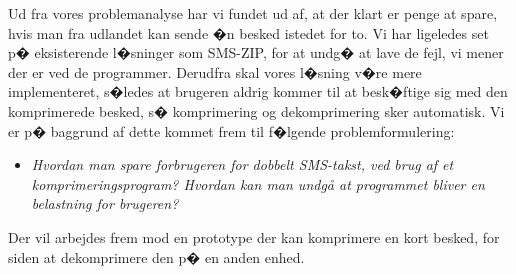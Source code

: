 Ud fra vores problemanalyse har vi fundet ud af, at der klart er penge at spare, hvis man fra udlandet kan sende �n besked istedet for to. Vi har ligeledes set p� eksisterende l�sninger som SMS-ZIP, for at undg� at lave de fejl, vi mener der er ved de programmer. Derudfra skal vores l�sning v�re mere implementeret, s�ledes at brugeren aldrig kommer til at besk�ftige sig med den komprimerede besked, s� komprimering og dekomprimering sker automatisk. Vi er p� baggrund af dette kommet frem til f�lgende problemformulering:

\begin{itemize}
\item[] \emph{Hvordan man spare forbrugeren for dobbelt SMS-takst, ved brug af et komprimeringsprogram? Hvordan kan man undgå at programmet bliver en belastning for brugeren?}
\end{itemize}

Der vil arbejdes frem mod en prototype der kan komprimere en kort besked, for siden at dekomprimere den p� en anden enhed. 